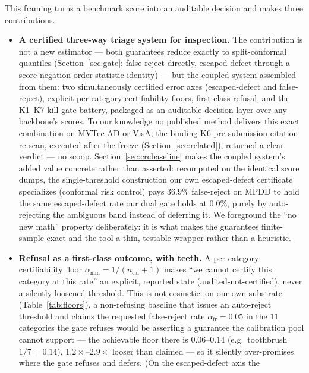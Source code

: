 \documentclass[11pt]{article}
\begin{document}
This framing turns a benchmark score into an auditable decision and makes three contributions.

\begin{itemize}
  \item \textbf{A certified three-way triage system for inspection.} The contribution is not
        a new estimator --- both guarantees reduce exactly to split-conformal quantiles
        (Section~\ref{sec:gate}: false-reject directly, escaped-defect through a score-negation
        order-statistic identity) --- but the coupled system assembled from them: two
        simultaneously certified error axes (escaped-defect and false-reject), explicit
        per-category certifiability floors, first-class refusal, and the K1--K7 kill-gate battery,
        packaged as an auditable decision layer over any backbone's scores. To our knowledge no
        published method delivers this exact combination on MVTec AD or VisA; the binding K6
        pre-submission citation re-scan, executed after the freeze (Section~\ref{sec:related}), returned a
        clear verdict --- no scoop. Section~\ref{sec:crcbaseline} makes the coupled system's added
        value concrete rather than asserted: recomputed on the identical score dumps, the
        single-threshold construction our own escaped-defect certificate specializes (conformal
        risk control) pays $36.9\%$ false-reject on MPDD to hold the same escaped-defect rate our
        dual gate holds at $0.0\%$, purely by auto-rejecting the ambiguous band instead of
        deferring it. We foreground the ``no new math''
        property deliberately: it is what makes the guarantees finite-sample-exact and the tool a
        thin, testable wrapper rather than a heuristic.
  \item \textbf{Refusal as a first-class outcome, with teeth.} A per-category certifiability floor
        $\alpha_{\min}=1/(n_{\text{cal}}+1)$ makes ``we cannot certify this category at this rate''
        an explicit, reported state (audited-not-certified), never a silently loosened threshold.
        This is not cosmetic: on our own substrate (Table~\ref{tab:floors}), a non-refusing baseline
        that issues an auto-reject threshold and claims the requested false-reject rate
        $\alpha_{\text{fr}}=0.05$ in the $11$ categories the gate refuses would be asserting a
        guarantee the calibration pool cannot support --- the achievable floor there is
        $0.06$--$0.14$ (e.g.\ toothbrush $1/7=0.14$), $1.2\times$--$2.9\times$ looser than claimed --- so
        it silently over-promises where the gate refuses and defers. (On the escaped-defect axis the

\end{itemize}
\end{document}

